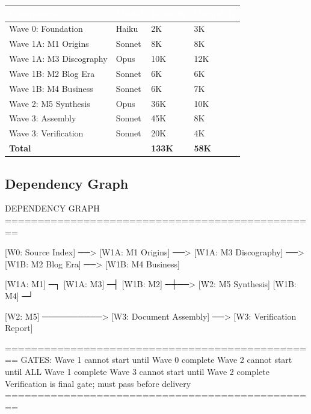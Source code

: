 \documentclass[11pt,letterpaper]{article}
\newcommand{\tableheader}[1]{\textbf{\sffamily\textcolor{white}{#1}}}
\begin{document}
\begin{center}
\begin{tabularx}{\textwidth}{L{4cm}C{2cm}C{2cm}C{2cm}}
\toprule
{}
\tableheader{Component} & \tableheader{Model} & \tableheader{Input K} & \tableheader{Output K} \\
\midrule
Wave 0: Foundation & Haiku & 2K & 3K \\
Wave 1A: M1 Origins & Sonnet & 8K & 8K \\
Wave 1A: M3 Discography & Opus & 10K & 12K \\
Wave 1B: M2 Blog Era & Sonnet & 6K & 6K \\
Wave 1B: M4 Business & Sonnet & 6K & 7K \\
Wave 2: M5 Synthesis & Opus & 36K & 10K \\
Wave 3: Assembly & Sonnet & 45K & 8K \\
Wave 3: Verification & Sonnet & 20K & 4K \\
\midrule
\textbf{Total} & & \textbf{133K} & \textbf{58K} \\
\bottomrule
\end{tabularx}
\end{center}

\subsection{Dependency Graph}

\begin{center}
\begin{asciibox}
DEPENDENCY GRAPH
================================================

[W0: Source Index] ──> [W1A: M1 Origins]
                   ──> [W1A: M3 Discography]
                   ──> [W1B: M2 Blog Era]
                   ──> [W1B: M4 Business]

[W1A: M1] ─┐
[W1A: M3] ─┤
[W1B: M2] ─┼──> [W2: M5 Synthesis]
[W1B: M4] ─┘

[W2: M5] ──────────> [W3: Document Assembly]
                ──> [W3: Verification Report]

================================================
GATES:
  Wave 1 cannot start until Wave 0 complete
  Wave 2 cannot start until ALL Wave 1 complete
  Wave 3 cannot start until Wave 2 complete
  Verification is final gate; must pass before delivery
================================================
\end{asciibox}
\end{center}
\end{document}
